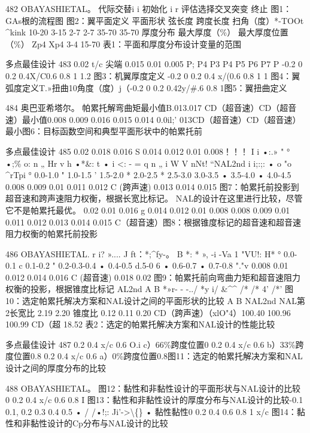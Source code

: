 \documentclass[UTF8,11pt,a4paper,openany,fontset=fandol]{ctexbook}
\begin{document}
482 OBAYASHIETAL。 代际交替i i 初始化 i r 评估选择交叉突变 终止 图1：GAs根的流程图 图2：翼平面定义 平面形状 弦长度 跨度长度 扫角（度）*-TOOt \textasciicircum{}kink 10-20 3-15 2-7 2-7 35-70 35-70 厚度分布 最大厚度（\%） 最大厚度位置（\%） Zp4 Xp4 3-4 15-70 表1：平面和厚度分布设计变量的范围

多点最佳设计 483 0.02 t/c 尖端 0.015 0.01 0.005 P; P4 P3 P4 P5 P6 P7 P -0.2 0 0.2 0.4X/C0.6 0.8 1 1.2 图3：机翼厚度定义 -0.2 0 0.2 0.4 x/(0.6 0.8 1 1 图4：翼弧度定义T.»扭曲10角度（度）j（-0.2 0 0.2 0.42y/\#.6 0.8 1图5：翼扭曲定义

484 奥巴亚希塔尔。 帕累托解弯曲矩最小值B.013.017 CD（超音速）CD（超音速）最小值0.008 0.009 0.016 0.015 0.014 0.0il;' 013CD（超音速）CD（超音速）最小图6：目标函数空间和典型平面形状中的帕累托前

多点最佳设计 485 0.02 0.018 0.016 S 0.014 0.012 0.01 0.008！！！ I i •:.» " ° •;\% o: n „ Hr v h •*\&: t • i <: - = q n „ i W V nNt! “NAL2nd i i;:;: • o "o \textasciicircum{}rTpi ° 0.0-1.0 " 1.0-1.5 ' 1.5-2.0 * 2.0-2.5 * 2.5-3.0 3.0-3.5 • 3.5-4.0 • 4.0-4.5 0.008 0.009 0.01 0.011 0.012 C (跨声速) 0.013 0.014 0.015 图7：帕累托前投影到超音速和跨声速阻力权衡，根据长宽比标记。 NAL的设计在这里进行比较，尽管它不是帕累托最优。 0.02 0.01 0.016 g 0.014 0.012 0.01 0.008 0.008 0.009 0.01 0.011 0.012 0.013 0.014 0.015 C（超音速）图8：根据锥度标记的超音速和超音速阻力权衡的帕累托前投影

486 OBAYASHIETAL. r i? ».... J ft：*;\textasciicircum{}fy-。 B *: * », -i -Va 1 "VU!: H* ° 0.0-0.1 c 0.1-0.2 " 0.2-0.3-0.4 • 0.4-0.5 d.5-0 6 • 0.6-0.7 • 0.7-0.8 "."v 0.008 0.01 0.012 0.014 0.016 C (超音速) 0.018 0.02 图9：帕累托前向弯曲力矩和超音速阻力权衡的投影，根据锥度比标记 AL2nd A B *»r- - -../ *y i/ \&\textasciicircum{}\textasciicircum{} /* /* 4' /*' 图10：选定帕累托解决方案和NAL设计之间的平面形状的比较 A B NAL2nd NAL第2长宽比 2.19 2.20 锥度比 0.12 0.11 0.20 CD（跨声速）（xlO"4）100.40 100.96 100.99 CD（超 18.52 表2：选定的帕累托解决方案和NAL设计的性能比较

多点最佳设计 487 0.2 0.4 x/c 0.6 O.i c）66\%跨度位置0 0.2 0.4 x/c 0.6 b）33\%跨度位置0.8 0.2 0.4 x/c 0.6 a）0\%跨度位置0.8图11：选定的帕累托解决方案和NAL设计之间的厚度分布的比较

488 OBAYASHIETAL。 图12：黏性和非黏性设计的平面形状与NAL设计的比较 0 0.2 0.4 x/c 0.6 0.8 I 图13：黏性和非黏性设计的厚度分布与NAL设计的比较-0.1 0.1, 0.2 0.3 0.4 0.5 • / /•!;: Ji'->\textbackslash\{\} • 黏性黏性0 0.2 0.4 0.6 0.8 1 x/c 图14：黏性和非黏性设计的Cp分布与NAL设计的比较
\end{document}
